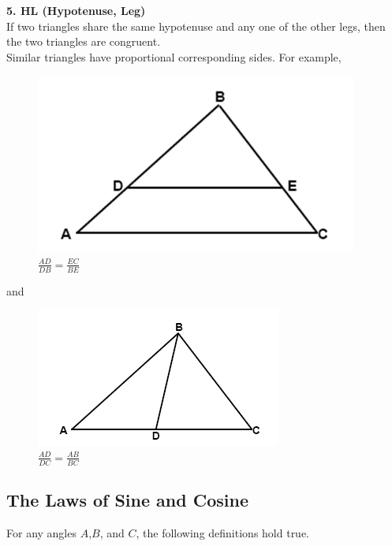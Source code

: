 \documentclass{article}
\begin{document}
            \noindent \color{purple}\textbf{5. HL (Hypotenuse, Leg)}\color{black} \\
            \noindent If two triangles share the same hypotenuse and any one of the other legs,
            then the two triangles are congruent. \\

            \noindent Similar triangles have proportional corresponding sides. For example, \\

            \begin{figure} [hbt!]
                \centering
                \includegraphics[scale = 0.6] {Resources/Unit2Triangles/sim1.PNG}
                \caption*{$\frac{AD}{DB}=\frac{EC}{BE}$}
            \end{figure}

            \noindent and \\

            \begin{figure} [hbt!]
                \centering
                \includegraphics[scale = 0.8] {Resources/Unit2Triangles/sim2.PNG}
                \caption*{$\frac{AD}{DC}=\frac{AB}{BC}$}
            \end{figure}

        \subsection{The Laws of Sine and Cosine}
            For any angles $A$,$B$, and $C$, the following definitions hold true.
\end{document}
